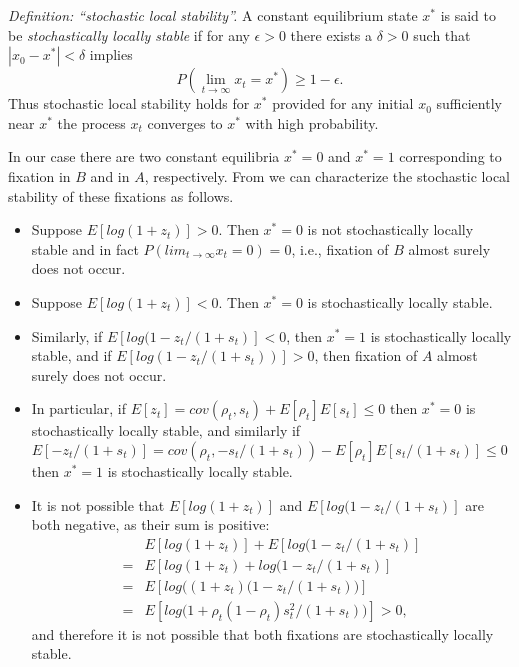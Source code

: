 \documentclass[14pt]{extarticle}
\begin{document}
{\it Definition: ``stochastic local stability''.}
A constant equilibrium state $x^*$ is said to be \emph{stochastically locally stable} if for any $\epsilon>0$ there exists a $\delta>0$ such that $|x_0-x^*|<\delta$ implies
\begin{equation}
P(\lim_{t \to \infty}x_t = x^*) \ge 1-\epsilon.
\end{equation}
Thus stochastic local stability holds for $x^*$ provided for any initial $x_0$ sufficiently near $x^*$ the process $x_t$ converges to $x^*$ with high probability.

In our case there are two constant equilibria $x^*=0$ and $x^*=1$ corresponding to fixation in $B$ and in $A$, respectively.
From \citet[][results~6 and 7]{Ram2018} we can characterize the stochastic local stability of these fixations as follows.

\begin{itemize}
\item Suppose $E[log(1+z_t)]>0$. Then $x^*=0$ is not stochastically locally stable and in fact $P(lim_{t \to \infty} x_t=0) = 0$, i.e., fixation of $B$ almost surely does not occur.
\item Suppose $E[log(1+z_t)]<0$. Then $x^*=0$ is stochastically locally stable. 
\item Similarly, if $E[log(1-z_t/(1+s_t)]<0$, then $x^*=1$ is stochastically locally stable, and if $E[log(1-z_t/(1+s_t))]>0$, then fixation of $A$ almost surely does not occur.
\item In particular, if $E[z_t] = cov(\rho_t, s_t) + E[\rho_t] E[s_t] \le 0$ then $x^*=0$ is stochastically locally stable, and similarly if $E[-z_t/(1+s_t)] = cov(\rho_t, -s_t/(1+s_t)) - E[\rho_t] E[s_t/(1+s_t)] \le 0$ then $x^*=1$ is stochastically locally stable.
\item It is not possible that $E[log(1+z_t)]$ and $E[log(1-z_t/(1+s_t)]$ are both negative, as their sum is positive:
\begin{equation}\begin{aligned}
{}&E[log(1+z_t)] + E[log(1-z_t/(1+s_t)]  \\
={} &E[log(1+z_t) + log(1-z_t/(1+s_t)] \\
={} &E[log\big((1+z_t)(1-z_t/(1+s_t)\big)] \\
={} &E[log\big( 1+\rho_t(1-\rho_t)s_t^2/(1+s_t) \big)] > 0,
\end{aligned}\end{equation}
and therefore it is not possible that both fixations are stochastically locally stable.
\end{itemize}
\end{document}
